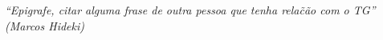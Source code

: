 \begin{epigrafe}
    \vspace*{\fill}
    \begin{flushright}

        \textit{“Epigrafe, citar alguma frase de outra pessoa que tenha rela\~c\~ao com o TG”\\
        (Marcos Hideki)}
    \end{flushright}
\end{epigrafe}